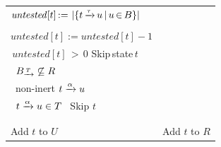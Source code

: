 \documentclass[a4paper,10pt]{article}
\theoremstyle{definition}
\theoremstyle{plain}
\newcommand{\bigo}[1]{{O\!\left(#1\right)}}
\newcommand{\bigO}{O}   %
\newcommand{\pijl}[1]{\mathrel{\text{$\xrightarrow{\smash[t]{#1}}$}}}
\newcommand{\lijp}[1]{\mathrel{\text{$\xleftarrow{\smash[t]{#1}}$}}}
\newcommand{\size}[1]{\left\lvert #1 \right\rvert}
\newcommand{\BT}{B_{\pijl{T}}}
\newcommand{\Bottom}{\mathit{Bottom}}
\newlength{\halflineskip}
\newcommand{\rightbrace}[3][0]{\setlength{\halflineskip}{0.5\baselineskip}\hspace{0pt plus 1filll}\makebox[0pt][l]{\smash{\tikz[baseline=#1\baselineskip]{\draw[thick,color=gray,line cap=round,decorate,decoration={brace,amplitude=2.3pt}] (0pt,0.7\baselineskip) ++(0.1em,0) -- ++(0pt,-#2\baselineskip+1pt) (5pt,\halflineskip-#2\halflineskip) node[color=gray,right,inner sep=0.1em,anchor=base west]{\small #3};}}}}
\begin{document}
\begin{algorithm}[tb]
\begin{algorithmic}[1]
\begin{tabular}{@{}p{5.95cm}||p{4.92cm}@{}}
		\STATE	\hspace*{4\algorithmicindent}$\mathit{untested}[t]\,{:=}\,\size{\{ t\,{\pijl{\tau}}\,u\,{\mid}\,u\,{\in}\,B \}}$          & \\ \label{alg:line-define-untested}
		\STATE	\hspace*{3\algorithmicindent}\algorithmicendif                                                                            & \\
		\STATE	\hspace*{3\algorithmicindent}$\mathit{untested}[t] := \mathit{untested}[t] - 1$                                           & \\
		\STATE	\hspace*{3\algorithmicindent}\algorithmicif\,$\mathit{untested}[t]\,{>}\,0$\,\algorithmicthen\,Skip\,state\,$t$           & \\
		\STATE	\hspace*{3\algorithmicindent}\algorithmicif\ $\BT\not \subseteq R$\ \algorithmicthen \label{alg:slow-test}       & \rightbrace{5}{\parbox[l]{0.3\textwidth}{%
																			$\bigO(\size{U_{\pijl{}}} + \mbox{}$ \\
																			$\phantom{\bigO (}\lvert(\Bottom(R) \setminus \mbox{}$ \\
																			$\phantom{\bigO (\lvert(}\Bottom(B))_{\pijl{}}\rvert)$}}\\
		\STATE	\hspace*{4\algorithmicindent}\algorithmicforall\ non-inert $t \pijl{\alpha} u$ \algorithmicdo                            & \\
		\STATE	\hspace*{5\algorithmicindent}\algorithmicif\ $t \pijl{\alpha} u \in T$  \algorithmicthen\ Skip $t$                        & \\
		\STATE	\hspace*{4\algorithmicindent}\algorithmicendfor                                                                           & \\
		\STATE	\hspace*{3\algorithmicindent}\algorithmicendif \label{alg:slow-test-end}                                                  & \\
		\STATE	\hspace*{3\algorithmicindent}Add $t$ to $U$                                                                               & \hspace*{2\algorithmicindent}Add $t$ to $R$\rightbrace{3}{\parbox[l]{0.3\textwidth}{$\bigo{\size{U_{\lijp{}}}}$ or \\ $\bigo{\size{R_{\lijp{}}}}$}}\\

\end{tabular}
\end{algorithmic}
\end{algorithm}
\end{document}
